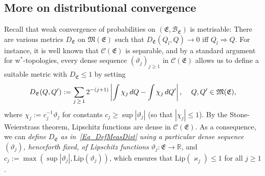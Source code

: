 \documentclass[10pt]{amsart}
\theoremstyle{definition}\newtheorem{defi}[theo]{Definition}\newtheorem{rema}[theo]{Remark}\newtheorem{exam}[theo]{Example}\newtheorem{exem}[theo]{Example}\newtheorem{nota}[theo]{Notation}
\newcommand{\clC}{\mathcal{C}}
\newcommand{\clB}{\mathcal{B}}
\newcommand{\Lip}{\mathrm{Lip}}
\newcommand{\frkE}{\mathfrak{E}}
\newcommand{\frkM}{\mathfrak{M}}
\newcommand{\bbR}{\mathbb{R}}
\begin{document}
\subsection{More on distributional convergence}
Recall that weak convergence of probabilities on $(\frkE,\clB_{\frkE})$ is metrisable: There are various metrics $D_{\frkE}$ on $\frkM(\frkE)$ such that $D_{\frkE}(Q_{l},Q)\rightarrow0$ iff $Q_{l}\Longrightarrow Q$. For instance, it is well known that $\clC(\frkE)$ is separable, and by a standard argument for w$^{\ast}$-topologies, every dense sequence $(\vartheta_{j})_{j\geq1}$ in $\clC(\frkE)$ allows us to define a suitable metric with $D_{\frkE}\leq1$ by setting
\begin{equation}\label{Eq_DefMeasDist}
D_{\frkE}(Q,Q^{\prime}):=\sum_{j\,\geq\,1}2^{-(j+1)}\left\vert \int\chi _{j}\,dQ-\int\chi_{j}\,dQ^{\prime}\right\vert \text{, \quad}Q,Q^{\prime}
\in\frkM(\frkE),
\end{equation}
where $\chi_{j}:=c_{j}^{-1}\vartheta_{j}$ for constants $c_{j}\geq
\sup\left\vert \vartheta_{j}\right\vert $ (so that $\left\vert \chi _{j}\right\vert \leq1$). By the Stone-Weierstrass theorem, Lipschitz functions are dense in $\clC(\frkE)$. As a consequence, we can
\emph{define} $D_{\frkE}$ \emph{as in~\eqref{Eq_DefMeasDist}}
\emph{using a particular dense sequence }$(\vartheta_{j})$\emph{, henceforth fixed, of Lipschitz functions} $\vartheta_{j}:\frkE\rightarrow
\bbR$, and $c_{j}:=\max(\sup\left\vert \vartheta_{j}\right\vert,\Lip(\vartheta_{j}))$, which ensures that $\Lip(\varkappa _{j})\leq1$ for all $j\geq1$.
\end{document}
